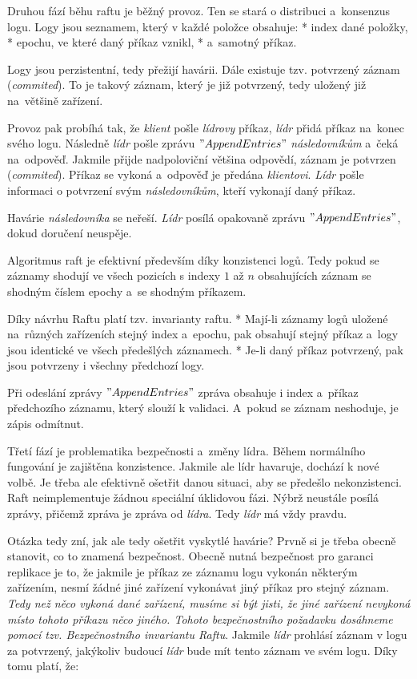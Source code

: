 {\sbf Druhou fází běhu raftu je běžný provoz}. Ten se stará o distribuci a~konsenzus logu. Logy jsou seznamem, který v každé položce obsahuje:
\begitems
* index dané položky,
* epochu, ve které daný příkaz vznikl,
* a~samotný příkaz.

Logy jsou perzistentní, tedy přežijí havárii. Dále existuje tzv. potvrzený záznam ({\em commited}). To je takový záznam, který je již potvrzený, tedy uložený již na~většině zařízení.

Provoz pak probíhá tak, že {\em klient} pošle {\em lídrovy} příkaz, {\em lídr} přidá příkaz na~konec svého logu. Následně {\em lídr} pošle zprávu $"AppendEntries"$ {\em následovníkům} a~čeká na~odpověď. Jakmile přijde nadpoloviční většina odpovědí, záznam je potvrzen ({\em commited}). Příkaz se vykoná a~odpověď je předána {\em klientovi}. {\em Lídr} pošle informaci o potvrzení svým {\em následovníkům}, kteří vykonají daný příkaz.

Havárie {\em následovníka} se neřeší. {\em Lídr} posílá opakovaně zprávu $"AppendEntries"$, dokud doručení neuspěje.

Algoritmus raft je efektivní především díky konzistenci logů. Tedy pokud se záznamy shodují ve všech pozicích s indexy $1$ až $n$ obsahujících záznam se shodným číslem epochy a~se shodným příkazem.

Díky návrhu Raftu platí tzv. {\sbf invarianty raftu}.
\begitems
* Mají-li záznamy logů uložené na~různých zařízeních stejný index a~epochu, pak obsahují stejný příkaz a~logy jsou identické ve všech předešlých záznamech.
* Je-li daný příkaz potvrzený, pak jsou potvrzeny i všechny předchozí logy.
\enditems

Při odeslání zprávy $"AppendEntries"$ zpráva obsahuje i index a~příkaz předchozího záznamu, který slouží k validaci. A~pokud se záznam neshoduje, je zápis odmítnut.

{\sbf Třetí fází je problematika bezpečnosti a~změny lídra}. Během normálního fungování je zajištěna konzistence. Jakmile ale lídr havaruje, dochází k nové volbě. Je třeba ale efektivně ošetřit danou situaci, aby se předešlo nekonzistenci. Raft neimplementuje žádnou speciální úklidovou fázi. Nýbrž neustále posílá zprávy, přičemž zpráva je zpráva od {\em lídra}. Tedy {\em lídr} má vždy pravdu.

Otázka tedy zní, jak ale tedy ošetřit vyskytlé havárie? Prvně si je třeba obecně stanovit, co to znamená {\sbf bezpečnost}. Obecně nutná bezpečnost pro garanci replikace je to, že jakmile je příkaz ze záznamu logu vykonán některým zařízením, nesmí žádné jiné zařízení vykonávat jiný příkaz pro stejný záznam. {\em Tedy než něco vykoná dané zařízení, musíme si být jisti, že jiné zařízení nevykoná místo tohoto příkazu něco jiného. Tohoto bezpečnostního požadavku dosáhneme pomocí tzv. {\sbf Bezpečnostního invariantu Raftu}}. Jakmile {\em lídr} prohlásí záznam v logu za potvrzený, jakýkoliv budoucí {\em lídr} bude mít tento záznam ve svém logu. Díky tomu platí, že:

